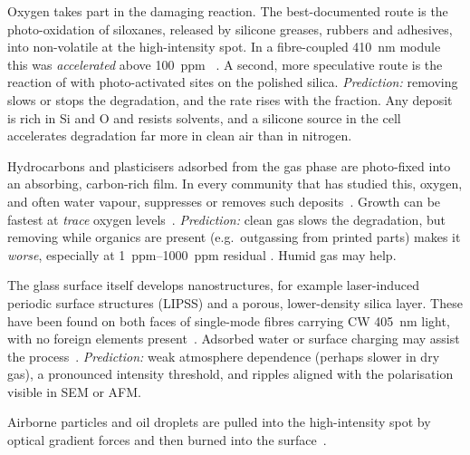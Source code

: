 \begin{description}[leftmargin=2.6em,style=nextline,itemsep=3pt]
  \item[H1 -- oxygen-assisted deposition or surface chemistry] Oxygen takes part in the damaging
        reaction. The best-documented route is the photo-oxidation of siloxanes, released by silicone
        greases, rubbers and adhesives, into non-volatile  at the high-intensity spot. In a
        fibre-coupled \SI{410}{nm} module this was \emph{accelerated} above \SI{100}{ppm}
        \Oxy~\cite{Fujifilmpatent2006}. A second, more speculative route is the reaction of \Oxy{} with
        photo-activated sites on the polished silica. \emph{Prediction:} removing \Oxy{} slows or
        stops the degradation, and the rate rises with the \Oxy{} fraction. Any deposit is rich in Si and
        O and resists solvents, and a silicone source in the cell accelerates degradation far more in
        clean air than in nitrogen.
  \item[H2 -- carbonaceous laser-induced contamination] Hydrocarbons and plasticisers adsorbed from the
        gas phase are photo-fixed into an absorbing, carbon-rich film. In every community that has
        studied this, oxygen, and often water vapour, suppresses or removes such
        deposits~\cite{Hippler2016,Mondin2017,Weiller2010}. Growth can be fastest at \emph{trace} oxygen
        levels~\cite{Parthasarathy2024}. \emph{Prediction:} clean gas slows the degradation, but removing
        \Oxy{} while organics are present (e.g.\ outgassing from printed parts) makes it \emph{worse},
        especially at \SIrange{1}{1000}{ppm} residual \Oxy. Humid gas may help.
  \item[H3 -- restructuring of the silica surface] The glass surface itself develops nanostructures,
        for example laser-induced periodic surface structures (LIPSS) and a porous, lower-density silica
        layer. These have been found on both faces of single-mode fibres carrying CW \SI{405}{nm} light,
        with no foreign elements present~\cite{Gonschior2013JNCS,Gonschior2013PhD}. Adsorbed water or
        surface charging may assist the process~\cite{Gonschior2013PhD}. \emph{Prediction:} weak
        atmosphere dependence (perhaps slower in dry gas), a pronounced intensity threshold, and ripples
        aligned with the polarisation visible in SEM or AFM.
  \item[H4 -- particle accumulation] Airborne particles and oil droplets are pulled into the
        high-intensity spot by optical gradient forces and then burned into the surface~\cite{Marciniak2017}.

\end{description}
